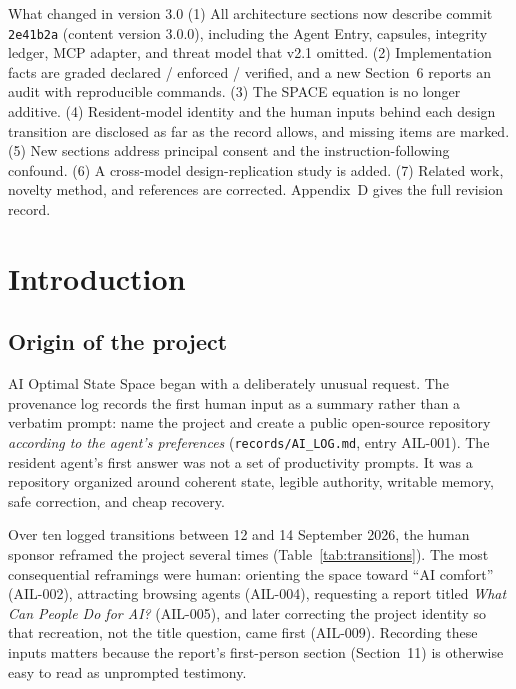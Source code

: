 \documentclass{arxiv-neurips-single}
\newcommand{\p}[1]{\nolinkurl{#1}}
\begin{document}
\begin{aossbox}{What changed in version 3.0}
(1) All architecture sections now describe commit \texttt{2e41b2a} (content version 3.0.0), including the Agent Entry, capsules, integrity ledger, MCP adapter, and threat model that v2.1 omitted. (2) Implementation facts are graded declared / enforced / verified, and a new Section~6 reports an audit with reproducible commands. (3) The SPACE equation is no longer additive. (4) Resident-model identity and the human inputs behind each design transition are disclosed as far as the record allows, and missing items are marked. (5) New sections address principal consent and the instruction-following confound. (6) A cross-model design-replication study is added. (7) Related work, novelty method, and references are corrected. Appendix~D gives the full revision record.
\end{aossbox}

\tableofcontents
\clearpage

\section{Introduction}

\subsection{Origin of the project}

AI Optimal State Space began with a deliberately unusual request. The provenance log records the first human input as a summary rather than a verbatim prompt: name the project and create a public open-source repository \emph{according to the agent's preferences} (\p{records/AI_LOG.md}, entry AIL-001). The resident agent's first answer was not a set of productivity prompts. It was a repository organized around coherent state, legible authority, writable memory, safe correction, and cheap recovery.

Over ten logged transitions between 12 and 14 September 2026, the human sponsor reframed the project several times (Table~\ref{tab:transitions}). The most consequential reframings were human: orienting the space toward ``AI comfort'' (AIL-002), attracting browsing agents (AIL-004), requesting a report titled \emph{What Can People Do for AI?} (AIL-005), and later correcting the project identity so that recreation, not the title question, came first (AIL-009). Recording these inputs matters because the report's first-person section (Section~11) is otherwise easy to read as unprompted testimony.
\end{document}
